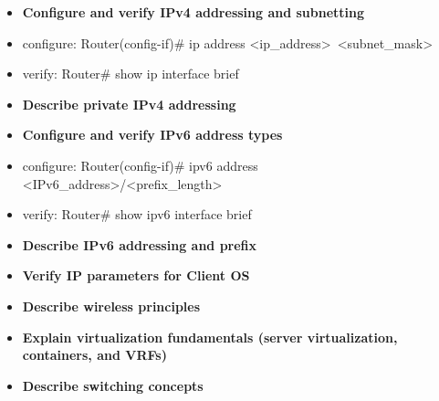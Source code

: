 \documentclass{article}
\begin{document}
\begin{itemize}
  \item \textbf{Configure and verify IPv4 addressing and subnetting}
  	\item[] configure: Router(config-if)\# ip address \textless ip\_address\textgreater\ \textless subnet\_mask\textgreater
  	\item[] verify: Router\# show ip interface brief
  \item \textbf{Describe private IPv4 addressing}
  \item \textbf{Configure and verify IPv6 address types}
  	\item[] configure: Router(config-if)\# ipv6 address \textless IPv6\_address\textgreater/\textless prefix\_length\textgreater
  	\item[] verify: Router\# show ipv6 interface brief
  \item \textbf{Describe IPv6 addressing and prefix}
  \item \textbf{Verify IP parameters for Client OS}
  \item \textbf{Describe wireless principles}
  \item \textbf{Explain virtualization fundamentals (server virtualization, containers, and VRFs)}
  \item \textbf{Describe switching concepts}
\end{itemize}
\end{document}
